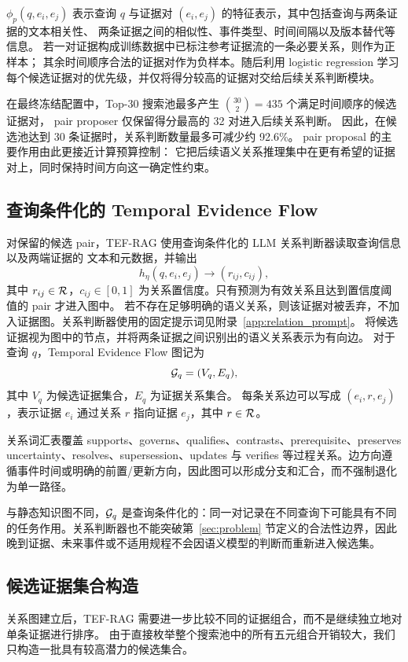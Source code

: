 $\phi_p(q,e_i,e_j)$
表示查询 $q$ 与证据对 $(e_i,e_j)$ 的特征表示，其中包括查询与两条证据的文本相关性、
两条证据之间的相似性、事件类型、时间间隔以及版本替代等信息。
若一对证据构成训练数据中已标注参考证据流的一条必要关系，则作为正样本；
其余时间顺序合法的证据对作为负样本。随后利用 logistic regression 
学习每个候选证据对的优先级，并仅将得分较高的证据对交给后续关系判断模块。

在最终冻结配置中，Top-30 搜索池最多产生
$\binom{30}{2}=435$ 个满足时间顺序的候选证据对，
pair proposer 仅保留得分最高的 32 对进入后续关系判断。
因此，在候选池达到 30 条证据时，关系判断数量最多可减少约 92.6\%。
pair proposal 的主要作用由此更接近计算预算控制：
它把后续语义关系推理集中在更有希望的证据对上，同时保持时间方向这一确定性约束。

\subsection{查询条件化的 Temporal Evidence Flow}

对保留的候选 pair，TEF-RAG 使用查询条件化的 LLM 关系判断器读取查询信息以及两端证据的
文本和元数据，并输出
\begin{equation}
h_{\eta}(q,e_i,e_j)
\rightarrow
(r_{ij},c_{ij}),
\end{equation}
其中 $r_{ij}\in\mathcal{R}$，$c_{ij}\in[0,1]$ 为关系置信度。只有预测为有效关系且达到置信度阈值的 pair 才进入图中。
若不存在足够明确的语义关系，则该证据对被丢弃，不加入证据图。关系判断器使用的固定提示词见附录~\ref{app:relation_prompt}。
将候选证据视为图中的节点，并将两条证据之间识别出的语义关系表示为有向边。
对于查询 $q$，Temporal Evidence Flow 图记为
\begin{equation}
\mathcal{G}_q=(V_q,E_q),
\end{equation}
其中 $V_q$ 为候选证据集合，$E_q$ 为证据关系集合。
每条关系边可以写成 $(e_i,r,e_j)$，表示证据 $e_i$ 通过关系 $r$ 指向证据 $e_j$，其中 $r\in\mathcal{R}$。

关系词汇表覆盖 supports、governs、qualifies、contrasts、prerequisite、preserves uncertainty、resolves、supersession、updates 与 verifies 等过程关系。边方向遵循事件时间或明确的前置/更新方向，因此图可以形成分支和汇合，而不强制退化为单一路径。

与静态知识图不同，$\mathcal{G}_q$ 是查询条件化的：同一对记录在不同查询下可能具有不同的任务作用。关系判断器也不能突破第~\ref{sec:problem} 节定义的合法性边界，因此晚到证据、未来事件或不适用规程不会因语义模型的判断而重新进入候选集。

\subsection{候选证据集合构造}
关系图建立后，TEF-RAG 需要进一步比较不同的证据组合，而不是继续独立地对单条证据进行排序。
由于直接枚举整个搜索池中的所有五元组合开销较大，我们只构造一批具有较高潜力的候选集合。

